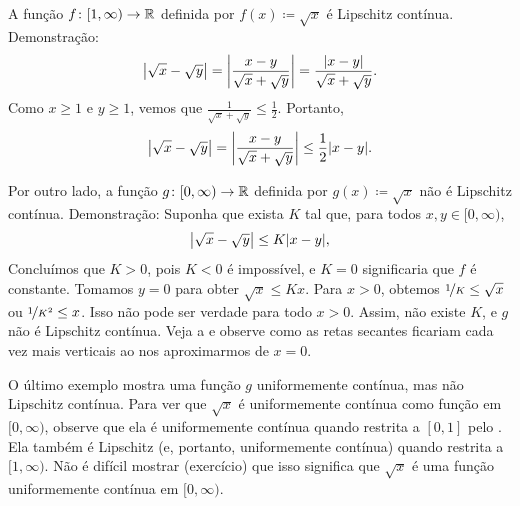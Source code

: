 \begin{example}
A função $f \colon [1,\infty) \to {\mathbb{R}}$ definida por $f(x) \coloneqq \sqrt{x}$
é Lipschitz contínua. Demonstração:
\begin{equation*}
\left\lvert {\sqrt{x}-\sqrt{y}} \right\rvert =
\left\lvert {\frac{x-y}{\sqrt{x}+\sqrt{y}}} \right\rvert
=
\frac{\lvert {x-y} \rvert}{\sqrt{x}+\sqrt{y}} .
\end{equation*}
Como $x \geq 1$ e $y \geq 1$, vemos que
$\frac{1}{\sqrt{x}+\sqrt{y}} \leq \frac{1}{2}$. Portanto,
\begin{equation*}
\left\lvert {\sqrt{x}-\sqrt{y}} \right\rvert =
\left\lvert {\frac{x-y}{\sqrt{x}+\sqrt{y}}} \right\rvert
\leq
\frac{1}{2}
\lvert {x-y} \rvert.
\end{equation*}

Por outro lado, a função $g \colon [0,\infty) \to {\mathbb{R}}$ definida por
$g(x) \coloneqq \sqrt{x}$ não é Lipschitz contínua. Demonstração:
Suponha que exista $K$ tal que, para todos $x,y \in [0,\infty)$,
\begin{equation*}
\left\lvert {\sqrt{x}-\sqrt{y}} \right\rvert
\leq
K \lvert {x-y} \rvert ,
\end{equation*}
Concluímos que $K > 0$, pois $K < 0$ é impossível,
e $K=0$ significaria que $f$ é constante.
Tomamos $y=0$ para obter
$\sqrt{x} \leq Kx$.
Para $x > 0$, obtemos
$\nicefrac{1}{K} \leq \sqrt{x}$ ou $\nicefrac{1}{K^2} \leq x$.
Isso não pode ser verdade para todo $x > 0$. Assim, não existe $K$,
e $g$ não é Lipschitz contínua. Veja a  e observe
como as retas secantes ficariam cada vez mais verticais ao nos aproximarmos
de $x=0$.
\begin{myfigureht}
\caption{Gráfico de $\sqrt{x}$ e algumas retas secantes que passam por
$(0,0)$ e $(x,\sqrt{x})$.\label{fig:sqrtgraph}}
\end{myfigureht}

O último exemplo mostra uma função $g$ uniformemente contínua,
mas não Lipschitz contínua.
Para ver que $\sqrt{x}$ é uniformemente contínua como função em $[0,\infty)$,
observe que ela é uniformemente contínua quando restrita a $[0,1]$ pelo
. Ela também é Lipschitz (e, portanto, uniformemente
contínua) quando restrita a $[1,\infty)$.
Não é difícil mostrar (exercício) que isso significa que $\sqrt{x}$ é uma
função uniformemente contínua em $[0,\infty)$.
\end{example}

